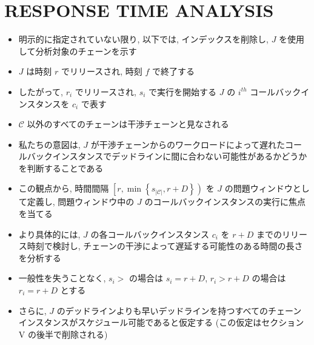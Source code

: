 

\section{RESPONSE TIME ANALYSIS}
\label{sec: responce_time_analysis}


\begin{frame}{}
    \begin{itemize}
        \item 明示的に指定されていない限り, 以下では, インデックスを削除し, $J$ を使用して分析対象のチェーンを示す
        \item $J$ は時刻 $r$ でリリースされ, 時刻 $f$ で終了する
        \item したがって, $r_{i}$ でリリースされ, $s_{i}$ で実行を開始する $J$ の $i^{t h}$ コールバックインスタンスを $c_{i}$ で表す
        \item $\mathcal{C}$ 以外のすべてのチェーンは干渉チェーンと見なされる
    \end{itemize}
\end{frame}

\begin{frame}{}
    \begin{itemize}
        \item 私たちの意図は, $J$ が干渉チェーンからのワークロードによって遅れたコールバックインスタンスでデッドラインに間に合わない可能性があるかどうかを判断することである
        \item この観点から, 時間間隔 $\left[r, \min \left\{s_{|\mathcal{C}|}, r+D\right\}\right)$ を $J$ の問題ウィンドウとして定義し, 問題ウィンドウ中の $J$ のコールバックインスタンスの実行に焦点を当てる
        \item より具体的には, $J$ の各コールバックインスタンス $c_{i}$ を $r+D$ までのリリース時刻で検討し, チェーンの干渉によって遅延する可能性のある時間の長さを分析する
    \end{itemize}
\end{frame}

\begin{frame}{}
    \begin{itemize}
        \item 一般性を失うことなく, $s_{i}>$ の場合は $s_{i}=r+D$, $r_{i}>r+D$ の場合は $r_{i}=r+D$ とする
        \item さらに,  $J$ のデッドラインよりも早いデッドラインを持つすべてのチェーン インスタンスがスケジュール可能であると仮定する (この仮定はセクション V の後半で削除される)
    \end{itemize}
\end{frame}

